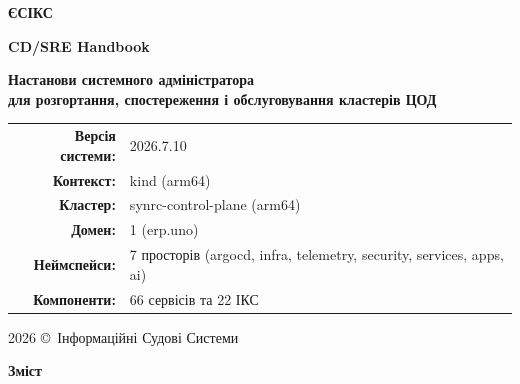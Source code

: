 \documentclass[12pt,a4paper]{article}
\newcommand\HUGE[1]{\fontsize{38}{38}\selectfont #1}
\begin{document}
\pagestyle{fancy}

\begin{titlepage}
\AddToShipoutPictureBG*{\AtPageLowerLeft{\color{primary}\rule{\paperwidth}{\paperheight}}}
\color{white}\thispagestyle{empty}\vspace*{3cm}\centering
  {\Huge \textbf{ЄСІКС} \par}\vspace{1.5cm}
  {\HUGE \textbf{CD/SRE Handbook} \par}\vspace{2cm}
  {\LARGE \textbf{Настанови системного адміністратора\\ для розгортання, спостереження і обслуговування кластерів ЦОД} \par}
  \vspace{1.5cm}
  \begin{tabular}{rl}
    \textbf{Версія системи:}  & 2026.7.10 \\[4pt]
    \textbf{Контекст:}        & kind (arm64) \\[4pt]
    \textbf{Кластер:}         & synrc-control-plane (arm64) \\[4pt]
    \textbf{Домен:}           & 1 (erp.uno)\\[4pt]
    \textbf{Неймспейси:}      & 7 просторів (argocd, infra, telemetry, security, services, apps, ai) \\[4pt]
    \textbf{Компоненти:}      & 66 сервісів та 22 ІКС \\[4pt]
  \end{tabular}
\vfill
  {\large 2026 \copyright\ Інформаційні Судові Системи\par}
\end{titlepage}

\newpage
\begin{center}{\Huge\color{primary}\bfseries Зміст\par}\end{center}
\vspace{30pt}
\tableofcontents

\newpage
\begin{abstract}
\noindent
Цей \textbf{CD/SRE Handbook} є офіційним технічним довідником з Continuous Deployment та Site Reliability Engineering
для платформи \textbf{ERP/1: Підприємство} компанії "Критпографічні Телесистеми". Він охоплює повну архітектуру
всіх просторів Kubernetes кластеру, деталізовану структуру Helm чартів,
специфікацію всіх маніфестів компонентів, а також практики SRE: SLI/SLO, бюджети на помилки, чергування і операційні вікна,
інженерія хаосу і GitOps/ArgoCD. Документ адаптує класичні принципи Site Reliability Engineering (Google SRE Book) до реалій державних
ERP систем із вимогами КСЗІ, мультитенантності та неперервного впровадження.
\end{abstract}
\end{document}
